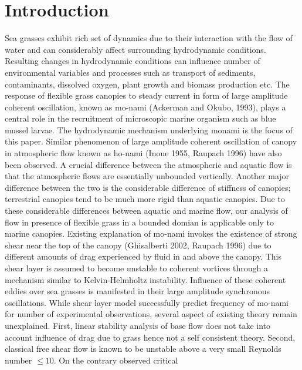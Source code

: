 \documentclass[aps,twocolumn,floatfix,prl,10pt]{revtex4-1}
\begin{document}
\section{Introduction}
Sea grasses exhibit rich set of dynamics due to their interaction with the flow of water and can considerably affect surrounding hydrodynamic conditions.
Resulting changes in hydrodynamic conditions can influence number of environmental variables and processes such as 
transport of sediments, contaminants, dissolved oxygen, plant growth and biomass production etc. 
The response of flexible grass canopies to steady current in form of large amplitude coherent oscillation, known as mo-nami (Ackerman and Okubo, 1993), plays a central role
in the recruitment of microscopic marine organism such as blue mussel larvae. The hydrodynamic mechanism underlying monami is the focus of this paper. 
\newline
Similar phenomenon of large amplitude coherent oscillation of canopy in atmospheric flow known as ho-nami (Inoue 1955, Raupach 1996) have also been observed.
A crucial difference between the atmospheric and aquatic flow is that the atmospheric flows are essentially unbounded vertically. Another major
difference between the two is the considerable difference of stiffness of canopies; terrestrial canopies tend to be much more rigid than aquatic canopies.
Due to these considerable differences between aquatic and marine flow, our analysis of flow in presence of flexible grass in a bounded domian is applicable only to marine canopies. 
\newline   
Existing explanation of mo-nami invokes the existence of strong shear near the top of the canopy (Ghisalberti 2002, Raupach 1996) due to
different amounts of drag experienced by fluid in and above the canopy. This shear layer is assumed to become unstable to coherent vortices through a mechanism similar to 
Kelvin-Helmholtz instability. Influence of these coherent eddies over sea grasses is manifested in their large amplitude synchronous oscillations.
\newline
While shear layer model successfully predict frequency of mo-nami for number of experimental observations,
several aspect of existing theory remain unexplained. First, linear stability analysis of base flow does not take into account influence of drag due to grass hence not a self 
consistent theory. Second, classical free shear flow is known to be unstable above a very small Reynolds number $\leq 10 $. On the contrary observed critical 
\end{document}
